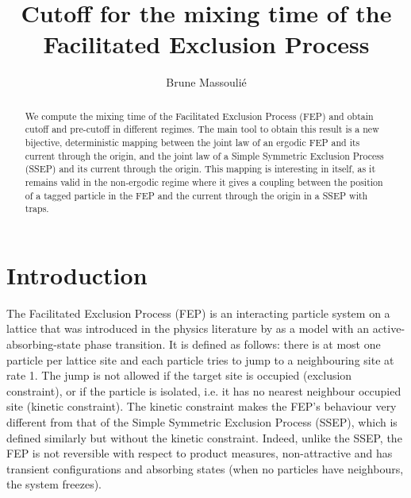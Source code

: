 \documentclass[11pt,a4paper]{article}
\title{Cutoff for the mixing time of the Facilitated Exclusion Process}
\author{Brune Massoulié}
\date{}
\begin{document}
\maketitle
\begin{abstract}
We compute the mixing time of the Facilitated Exclusion Process (FEP) and obtain cutoff and pre-cutoff in different regimes. The main tool to obtain this result is a new bijective, deterministic mapping between the joint law of an ergodic FEP and its current through the origin, and the joint law of a Simple Symmetric Exclusion Process (SSEP) and its current through the origin. This mapping is interesting in itself, as it remains valid in the non-ergodic regime where it gives a coupling between the position of a tagged particle in the FEP and the current through the origin in a SSEP with traps.
\end{abstract}


\section{Introduction}
The Facilitated Exclusion Process (FEP) is an interacting particle system on a lattice that was introduced in the physics literature by \cite{rossi_universality_2000, basu_activeabsorbing-state_2009} as a model with an active-absorbing-state phase transition. It is defined as follows: there is at most one particle per lattice site and each particle tries to jump to a neighbouring site at rate 1. The jump is not allowed if the target site is occupied (exclusion constraint), or if the particle is isolated, i.e. it has no nearest neighbour occupied site (kinetic constraint). The kinetic constraint makes the FEP's behaviour very different from that of the Simple Symmetric Exclusion Process (SSEP), which is defined similarly but without the kinetic constraint. Indeed, unlike the SSEP, the FEP is not reversible with respect to product measures, non-attractive and has transient configurations and absorbing states (when no particles have neighbours, the system freezes). 
\end{document}
